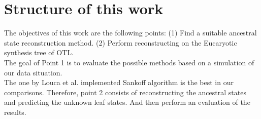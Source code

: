  \section{Structure of this work}
    The objectives of this work are the following points: (1) Find a suitable ancestral state 
      reconstruction method. (2) Perform reconstructing on the Eucaryotic synthesis tree of OTL. \\
    The goal of Point 1 is to evaluate the possible methods based on a simulation of our data 
      situation. \\
    The one by Louca et al. implemented Sankoff algorithm is the best in our comparisons. Therefore, 
      point 2 consists of reconstructing the ancestral states and predicting the unknown leaf states. 
      And then perform an evaluation of the results.

